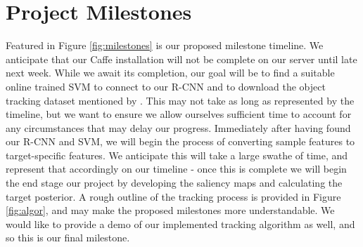 \documentclass{sig-alternate-05-2015}
\begin{document}
\section{Project Milestones}
Featured in Figure \ref{fig:milestones} is our proposed milestone timeline. We anticipate that our Caffe installation will not be complete on our server until late next week. While we await its completion, our goal will be to find a suitable online trained SVM to connect to our R-CNN and to download the object tracking dataset mentioned by \cite{hong2015online}. This may not take as long as represented by the timeline, but we want to ensure we allow ourselves sufficient time to account for any circumstances that may delay our progress. Immediately after having found our R-CNN and SVM, we will begin the process of converting sample features to target-specific features. We anticipate this will take a large swathe of time, and represent that accordingly on our timeline - once this is complete we will begin the end stage our project by developing the saliency maps and calculating the target posterior. A rough outline of the tracking process is provided in Figure \ref{fig:algor}, and may make the proposed milestones more understandable. We would like to provide a demo of our implemented tracking algorithm as well, and so this is our final milestone.


\end{document}
